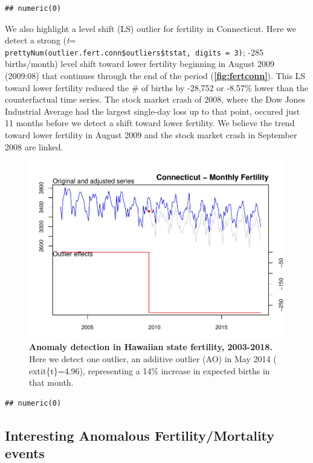 \documentclass[12pt]{article}
\begin{document}
\begin{verbatim}
## numeric(0)
\end{verbatim}

We also highlight a level shift (LS) outlier for fertility in
Connecticut. Here we detect a strong (\emph{t}=
\texttt{prettyNum(outlier.fert.conn\$outliers\$tstat,\ digits\ =\ 3)};
-285 births/month) level shift toward lower fertility beginning in
August 2009 (2009:08) that continues through the end of the period
(\textbf{\autoref{fig:fertconn}}). This LS toward lower fertility
reduced the \# of births by -28,752 or -8.57\% lower than the
counterfactual time series. The stock market crash of 2008, where the
Dow Jones Industrial Average had the largest single-day loss up to that
point, occured just 11 months before we detect a shift toward lower
fertility. We believe the trend toward lower fertility in August 2009
and the stock market crash in September 2008 are linked.

\begin{figure}
\centering
\includegraphics{manuscript_files/figure-latex/FertilityConnecticut-1.pdf}
\caption{\textbf{Anomaly detection in Hawaiian state fertility, 2003-2018.}
Here we detect one outlier, an additive outlier (AO) in May 2014 (
extit\{t\}=4.96), representing a 14\% increase in expected births in
that month. \label{fig:fertconn}}
\end{figure}

\begin{verbatim}
## numeric(0)
\end{verbatim}

\hypertarget{interesting-anomalous-fertilitymortality-events}{%
\subsection{Interesting Anomalous Fertility/Mortality
events}\label{interesting-anomalous-fertilitymortality-events}}
\end{document}
